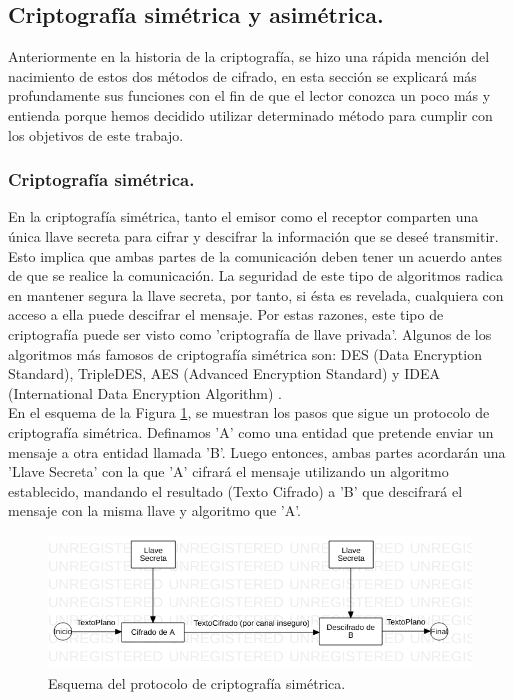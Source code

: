 \documentclass[12pt, a4paper, titlepage]{report}
\begin{document}
            \subsection{Criptografía simétrica y asimétrica.}
                Anteriormente en la historia de la criptografía, se hizo una rápida mención del nacimiento de estos dos métodos de cifrado, en esta sección se explicará más profundamente sus funciones con el fin de que el lector conozca un poco más y entienda porque hemos decidido utilizar determinado método para cumplir con los objetivos de este trabajo.
                
                \subsubsection{Criptografía simétrica.}
                En la criptografía simétrica, tanto el emisor como el receptor comparten una única llave secreta para cifrar y descifrar la información que se deseé transmitir. Esto implica que ambas partes de la comunicación deben tener un acuerdo antes de que se realice la comunicación. La seguridad de este tipo de algoritmos radica en mantener segura la llave secreta, por tanto, si ésta es revelada, cualquiera con acceso a ella puede descifrar el mensaje. Por estas razones, este tipo de criptografía puede ser visto como 'criptografía de llave privada'. Algunos de los algoritmos más famosos de criptografía simétrica son: DES (Data Encryption Standard), TripleDES, AES (Advanced Encryption Standard) y IDEA (International Data Encryption Algorithm) \cite{refCriptografia}.\\
                En el esquema de la Figura \ref{fig:criptoSimetrica}, se muestran los pasos que sigue un protocolo de criptografía simétrica. Definamos 'A' como una entidad que pretende enviar un mensaje a otra entidad llamada 'B'. Luego entonces, ambas partes acordarán una 'Llave Secreta' con la que 'A' cifrará el mensaje utilizando un algoritmo establecido, mandando el resultado (Texto Cifrado) a 'B' que descifrará el mensaje con la misma llave y algoritmo que 'A'.
                
                \begin{figure}[H]
        			\begin{center}	                  \includegraphics[width=14cm]{./imagenes/MarcoTeorico/cripto_simetrica.png}
        				\caption{Esquema del protocolo de criptografía simétrica.}
        				\label{fig:criptoSimetrica}
        			\end{center}
        		\end{figure}
        		
\end{document}
